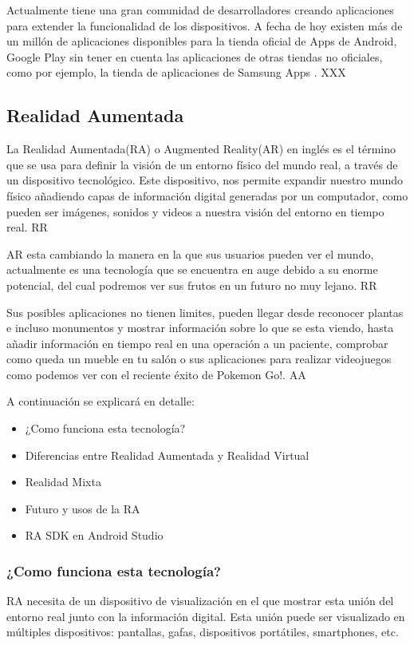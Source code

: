 Actualmente tiene una gran comunidad de desarrolladores creando aplicaciones para extender la funcionalidad de los dispositivos. A fecha de hoy existen más de un millón de aplicaciones disponibles para la tienda oficial de Apps de Android, Google Play \cite{URL::GooglePlay} sin tener en cuenta las aplicaciones de otras tiendas no oficiales, como por ejemplo, la tienda de aplicaciones de Samsung Apps \cite{URL::SamsungApps}. XXX

\subsection{Realidad Aumentada}

La Realidad Aumentada(RA) o Augmented Reality(AR) en inglés es el término que se usa para definir la visión de un entorno físico del mundo real, a través de un dispositivo tecnológico. Este dispositivo, nos permite expandir nuestro mundo físico añadiendo capas de información digital generadas por un computador, como pueden ser imágenes, sonidos y videos a nuestra visión del entorno en tiempo real. RR

AR esta cambiando la manera en la que sus usuarios pueden ver el mundo, actualmente es una tecnología que se encuentra en auge debido a su enorme potencial, del cual podremos ver sus frutos en un futuro no muy lejano. RR

Sus posibles aplicaciones no tienen limites, pueden llegar desde reconocer plantas e incluso monumentos y mostrar información sobre lo que se esta viendo, hasta añadir información en tiempo real en una operación a un paciente, comprobar como queda un mueble en tu salón o sus aplicaciones para realizar videojuegos como podemos ver con el reciente éxito de Pokemon Go!. AA

A continuación se explicará en detalle:
\begin{itemize}
\item ¿Como funciona esta tecnología?
\item Diferencias entre Realidad Aumentada y Realidad Virtual
\item Realidad Mixta
\item Futuro y usos de la RA
\item RA SDK en Android Studio
\end{itemize}  

\subsubsection{¿Como funciona esta tecnología?}
 RA necesita de un dispositivo de visualización en el que mostrar esta unión del entorno real junto con la información digital. Esta unión puede ser visualizado en múltiples dispositivos: pantallas, gafas, dispositivos portátiles, smartphones, etc.
 
